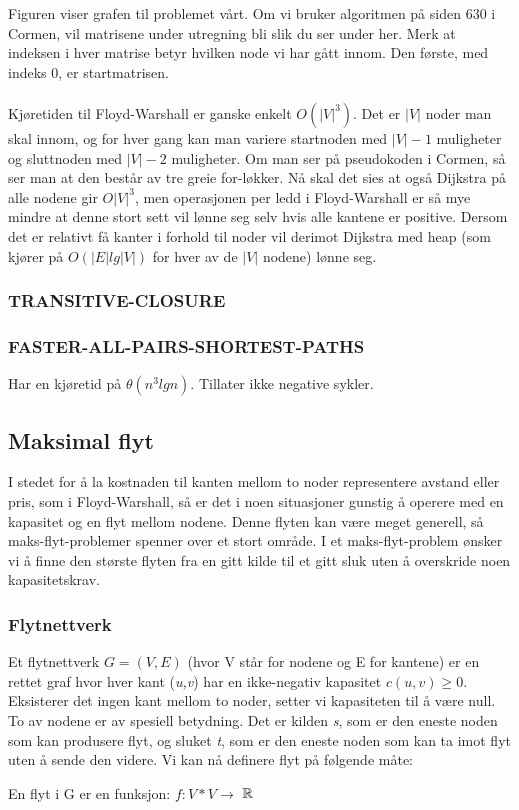 \noindent Figuren viser grafen til problemet vårt. Om vi bruker algoritmen på siden 630 i Cormen, vil matrisene under utregning bli slik du ser under her. Merk at indeksen i hver matrise betyr hvilken node vi har gått innom. Den første, med indeks 0, er startmatrisen. 
\\\\
\noindent Kjøretiden til Floyd-Warshall er ganske enkelt $O(|V|^3)$. Det er $|V|$ noder man skal innom, og for hver gang kan man variere startnoden med $|V| - 1$ muligheter og sluttnoden med $|V| - 2$ muligheter. Om man ser på pseudokoden i Cormen, så ser man at den består av tre greie for-løkker. Nå skal det sies at også Dijkstra på alle nodene gir $O|V|^3$, men operasjonen per ledd i Floyd-Warshall er så mye mindre at denne stort sett vil lønne seg selv hvis alle kantene er positive. Dersom det er relativt få kanter i forhold til noder vil derimot Dijkstra med heap (som kjører på $O(|E| lg |V|)$ for hver av de $|V|$ nodene) lønne seg.

\subsubsection{TRANSITIVE-CLOSURE}

\subsubsection{FASTER-ALL-PAIRS-SHORTEST-PATHS}
Har en kjøretid på $\theta(n^3 lg n)$. Tillater ikke negative sykler.

\subsection{Maksimal flyt}
I stedet for å la kostnaden til kanten mellom to noder representere avstand eller pris, som i Floyd-Warshall, så er det i noen situasjoner gunstig å operere med en kapasitet og en flyt mellom nodene. Denne flyten kan være meget generell, så maks-flyt-problemer spenner over et stort område. I et maks-flyt-problem ønsker vi å finne den største flyten fra en gitt kilde til et gitt sluk uten å overskride noen kapasitetskrav.

\subsubsection{Flytnettverk}
Et flytnettverk $G = (V,E)$ (hvor V står for nodene og E for kantene) er en rettet graf hvor hver kant (\textit{u,v}) har en ikke-negativ kapasitet $c(u,v) \geq 0$. Eksisterer det ingen kant mellom to noder, setter vi kapasiteten til å være null. To av nodene er av spesiell betydning. Det er kilden \textit{s}, som er den eneste noden som kan produsere flyt, og sluket \textit{t}, som er den eneste noden som kan ta imot flyt uten å sende den videre. Vi kan nå definere flyt på følgende måte:
\begin{center}
En flyt i G er en funksjon: $f: V * V \rightarrow$  ${\Bbb R}$
\end{center}

